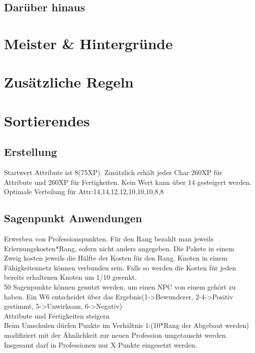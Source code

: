 \documentclass[a4paper,12pt,oneside]{book}
\begin{document}
\chapter{Darüber hinaus}

\part{Meister \& Hintergründe}
\setcounter{chapter}{0}
\part{Zusätzliche Regeln}
\setcounter{chapter}{0}

\part{Sortierendes}

\chapter{Erstellung}
Startwert Attribute ist 8(75XP).
Zusätzlich erhält jeder Char 260XP für Attribute und 260XP für Fertigkeiten. Kein Wert kann über 14 gesteigert werden.
Optimale Verteilung für Attr:14,14,12,12,10,10,10,8,8

\chapter{Sagenpunkt Anwendungen}
Erwerben von Professionspunkten. Für den Rang bezahlt man jeweils Erlernungskosten*Rang, sofern nicht anders angegeben. Die Pakete in einem Zweig kosten jeweils die Hälfte der Kosten für den Rang. Knoten in einem Fähigkeitennetz können verbunden sein. Falls so werden die Kosten für jeden bereits erhaltenen Knoten um 1/10 gesenkt.
\\50 Sagenpunkte können genutzt werden, um einen NPC von einem gehört zu haben. Ein W6 entscheidet über das Ergebnis(1->Bewunderer, 2-4->Positiv gestimmt, 5->Unwirksam, 6->Negativ)
\\Attribute und Fertigkeiten steigern
\\Beim Umschulen dürfen Punkte im Verhältnis 1:(10*Rang der Abgebaut werden) modifiziert mit der Ähnlichkeit zur neuen Profession umgetauscht werden. 
\\Insgesamt darf in Professionen nur X Punkte eingesetzt werden.
\end{document}
